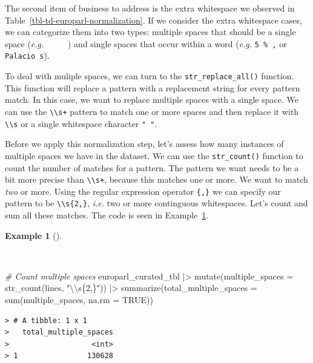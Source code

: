 \documentclass[
  letterpaper,
  DIV=11,
  numbers=noendperiod]{scrreport}
\newenvironment{Shaded}{\begin{snugshade}}{\end{snugshade}}
\newcommand{\AttributeTok}[1]{\textcolor[rgb]{0.00,0.00,0.00}{#1}}
\newcommand{\CommentTok}[1]{\textcolor[rgb]{0.00,0.00,0.00}{\textit{#1}}}
\newcommand{\ConstantTok}[1]{\textcolor[rgb]{0.00,0.00,0.00}{#1}}
\newcommand{\FunctionTok}[1]{\textcolor[rgb]{0.00,0.00,0.00}{#1}}
\newcommand{\NormalTok}[1]{\textcolor[rgb]{0.00,0.00,0.00}{#1}}
\newcommand{\SpecialCharTok}[1]{\textcolor[rgb]{0.00,0.00,0.00}{#1}}
\newcommand{\StringTok}[1]{\textcolor[rgb]{0.00,0.00,0.00}{#1}}
\theoremstyle{definition}
\newtheorem{example}{Example}[chapter]
\theoremstyle{remark}
\begin{document}
The second item of business to address is the extra whitespace we
observed in Table~\ref{tbl-td-europarl-normalization}. If we consider
the extra whitespace cases, we can categorize them into two types:
multiple spaces that should be a single space (\emph{e.g.} ~~~~~) and
single spaces that occur within a word (\emph{e.g.} \texttt{5\ \%\ ,} or
\texttt{Palacio\textquotesingle{}\ s}).

To deal with muliple spaces, we can turn to the
\texttt{str\_replace\_all()} function. This function will replace a
pattern with a replacement string for every pattern match. In this case,
we want to replace multiple spaces with a single space. We can use the
\texttt{\textbackslash{}\textbackslash{}s+} pattern to match one or more
spaces and then replace it with
\texttt{\textbackslash{}\textbackslash{}s} or a single whitespace
character \texttt{"\ "}.

Before we apply this normalization step, let's assess how many instances
of multiple spaces we have in the dataset. We can use the
\texttt{str\_count()} function to count the number of matches for a
pattern. The pattern we want needs to be a bit more precise than
\texttt{\textbackslash{}\textbackslash{}s+}, because this matches one or
more. We want to match \emph{two} or more. Using the regular expression
operator \texttt{\{,\}} we can specify our pattern to be
\texttt{\textbackslash{}\textbackslash{}s\{2,\}}, \emph{i.e.} two or
more continguous whitespaces. Let's count and sum all these matches. The
code is seen in Example~\ref{exm-td-europarl-count-whitespace}.

\begin{example}[]\protect\hypertarget{exm-td-europarl-count-whitespace}{}\label{exm-td-europarl-count-whitespace}

~

\begin{Shaded}
\begin{Highlighting}[]
\CommentTok{\# Count multiple spaces}
\NormalTok{europarl\_curated\_tbl }\SpecialCharTok{|\textgreater{}}
  \FunctionTok{mutate}\NormalTok{(}\AttributeTok{multiple\_spaces =} \FunctionTok{str\_count}\NormalTok{(lines, }\StringTok{"}\SpecialCharTok{\textbackslash{}\textbackslash{}}\StringTok{s\{2,\}"}\NormalTok{)) }\SpecialCharTok{|\textgreater{}}
  \FunctionTok{summarize}\NormalTok{(}\AttributeTok{total\_multiple\_spaces =} \FunctionTok{sum}\NormalTok{(multiple\_spaces, }\AttributeTok{na.rm =} \ConstantTok{TRUE}\NormalTok{))}
\end{Highlighting}
\end{Shaded}

\begin{verbatim}
> # A tibble: 1 x 1
>   total_multiple_spaces
>                   <int>
> 1                130628
\end{verbatim}

\end{example}
\end{document}
